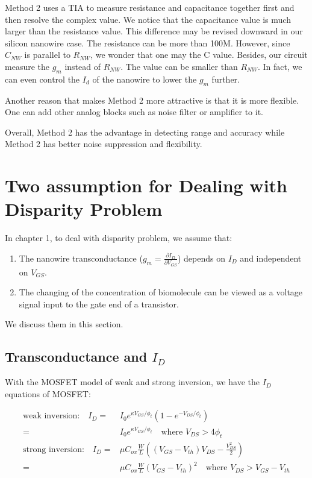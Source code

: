 Method 2 uses a TIA to measure resistance and capacitance together first and then resolve the complex value.
We notice that the capacitance value is much larger than the resistance value.
This difference may be revised downward in our silicon nanowire case.
The resistance can be more than 100M.
However, since $C_{NW}$ is parallel to $R_{NW}$, we wonder that one may the C value.
Besides, our circuit measure the $g_m$ instead of $R_{NW}$.
The value can be smaller than $R_{NW}$.
In fact, we can even control the $I_d$ of the nanowire to lower the $g_m$ further.

Another reason that makes Method 2 more attractive is that it is more flexible.
One can add other analog blocks such as noise filter or amplifier to it.

Overall, Method 2 has the advantage in detecting range and accuracy while Method 2 has better noise suppression and flexibility.



\section{Two assumption for Dealing with Disparity Problem}
In chapter 1, to deal with disparity problem, we assume that:
\begin{enumerate}
    \item The nanowire transconductance ($g_m = \frac{\partial I_D}{\partial V_{GS}}$) depends on $I_D$ and independent on $V_{GS}$.
    \item The changing of the concentration of biomolecule can be viewed as a voltage signal input to the gate end of a transistor.
\end{enumerate}
We discuss them in this section.

\subsection{Transconductance and $I_D$} \label{section:IdGm}
With the MOSFET model of weak and strong inversion, we have the $I_D$ equations of MOSFET:
\setlength{\mathindent}{1.5cm}

\begin{align}
    \text{weak inversion:} \quad I_D   = & I_0e^{\kappa V_{GS}/\phi_t}(1 - e^{-V_{DS}/\phi_t})\\
                                       = & I_0e^{\kappa V_{GS}/\phi_t} \quad \text{where $V_{DS} > 4 \phi_t$ } \\
    \text{strong inversion:} \quad I_D = & \mu C_{ox} \frac{W}{L}((V_{GS} - V_{th})V_{DS} - \frac{V_{DS}^2}{2}) \\
                                       = & \mu C_{ox} \frac{W}{L}(V_{GS} - V_{th})^2 \quad \text{where $V_{DS} > V_{GS} - V_{th}$} \label{eq:ID_Strong}
\end{align}

